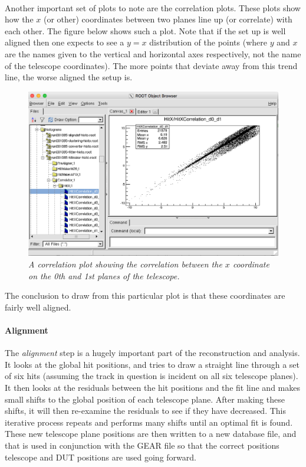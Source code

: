 \documentclass[11pt]{article}
\begin{document}
\paragraph{}
Another important set of plots to note are the correlation plots. These plots show how the $x$ (or other) coordinates between two planes line up (or correlate) with each other. The figure below shows such a plot. Note that if the set up is well aligned then one expects to see a $y=x$ distribution of the points (where $y$ and $x$ are the names given to the vertical and horizontal axes respectively, not the name of the telescope coordinates). The more points that deviate away from this trend line, the worse aligned the setup is.
\begin{figure}[!ht]
	\centering
	\includegraphics[scale=0.4]{images/hitmaker_corr.png}
	\caption{\textit{A correlation plot showing the correlation between the $x$ coordinate on the 0th and 1st planes of the telescope.}}
\end{figure}
The conclusion to draw from this particular plot is that these coordinates are fairly well aligned.
\paragraph{Alignment}
The \textit{alignment} step is a hugely important part of the reconstruction and analysis. It looks at the global hit positions, and tries to draw a straight line through a set of six hits (assuming the track in question is incident on all six telescope planes). It then looks at the residuals between the hit positions and the fit line and makes small shifts to the global position of each telescope plane. After making these shifts, it will then re-examine the residuals to see if they have decreased. This iterative process repeats and performs many shifts until an optimal fit is found. These new telescope plane positions are then written to a new database file, and that is used in conjunction with the GEAR file so that the correct positions telescope and DUT positions are used going forward.
\end{document}
